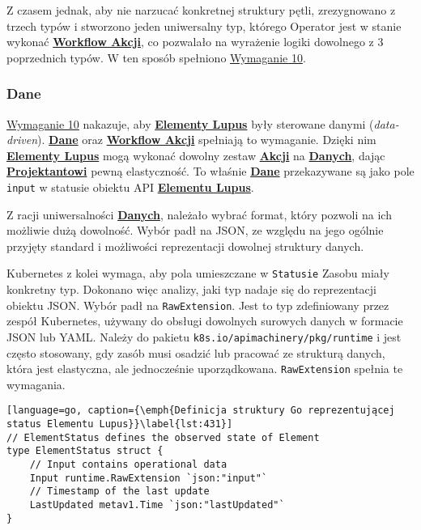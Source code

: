 Z czasem jednak, aby nie narzucać konkretnej struktury pętli, zrezygnowano z trzech typów i stworzono jeden uniwersalny typ, którego Operator jest w stanie wykonać \hyperlink{def:workflow-petli}{\textbf{Workflow Akcji}}, co pozwalało na wyrażenie logiki dowolnego z 3 poprzednich typów. W ten sposób spełniono \hyperref[req:10]{Wymaganie 10}.

\subsubsection{Dane}

\hyperref[req:10]{Wymaganie 10} nakazuje, aby \hyperlink{def:element-lupus}{\textbf{Elementy Lupus}} były sterowane danymi (\textit{data-driven}). \hyperlink{def:dane}{\textbf{Dane}} oraz \hyperlink{def:workflow-petli}{\textbf{Workflow Akcji}} spełniają to wymaganie. Dzięki nim \hyperlink{def:element-lupus}{\textbf{Elementy Lupus}} mogą wykonać dowolny zestaw \hyperlink{def:akcja}{\textbf{Akcji}} na \hyperlink{def:dane}{\textbf{Danych}}, dając \hyperlink{def:projektant}{\textbf{Projektantowi}} pewną elastyczność. To właśnie \hyperlink{def:dane}{\textbf{Dane}} przekazywane są jako pole \texttt{input} w statusie obiektu API \hyperlink{def:element-lupus}{\textbf{Elementu Lupus}}. 

Z racji uniwersalności \hyperlink{def:dane}{\textbf{Danych}}, należało wybrać format, który pozwoli na ich możliwie dużą dowolność. Wybór padł na JSON, ze względu na jego ogólnie przyjęty standard i możliwości reprezentacji dowolnej struktury danych. 

Kubernetes z kolei wymaga, aby pola umieszczane w \texttt{Statusie} Zasobu miały konkretny typ. Dokonano więc analizy, jaki typ nadaje się do reprezentacji obiektu JSON. Wybór padł na \texttt{RawExtension}. Jest to typ zdefiniowany przez zespół Kubernetes, używany do obsługi dowolnych surowych danych w formacie JSON lub YAML. Należy do pakietu \texttt{k8s.io/apimachinery/pkg/runtime} i jest często stosowany, gdy zasób musi osadzić lub pracować ze strukturą danych, która jest elastyczna, ale jednocześnie uporządkowana. \texttt{RawExtension} spełnia te wymagania.

\begin{lstlisting}[language=go, caption={\emph{Definicja struktury Go reprezentującej status Elementu Lupus}}\label{lst:431}]
// ElementStatus defines the observed state of Element
type ElementStatus struct {
	// Input contains operational data
	Input runtime.RawExtension `json:"input"`
	// Timestamp of the last update
	LastUpdated metav1.Time `json:"lastUpdated"`
}
\end{lstlisting}

